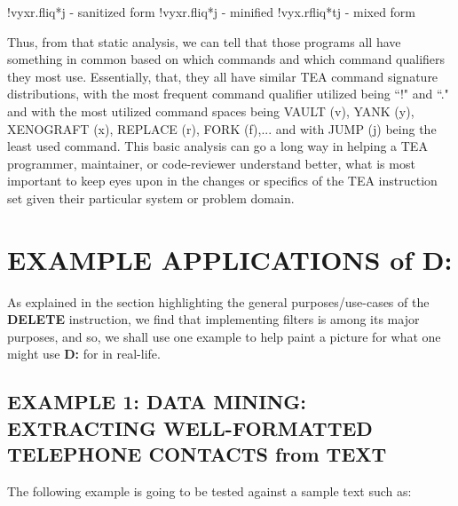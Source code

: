\documentclass[a4paper, 18pt]{book} %
\begin{document}
\vspace{2em}

   \begin{tcbverbatim}[title=Sample TEA Program Signature Outputs from Fibonacci Programs]
!vyxr.fliq*j - sanitized form
!vyxr.fliq*j - minified
!vyx.rfliq*tj - mixed form
  \end{tcbverbatim}

\vspace{2em}

Thus, from that static analysis, we can tell that those programs all have something in common based on which commands and which command qualifiers they most use. Essentially, that, they all have similar TEA command signature distributions, with the most frequent command qualifier utilized being ``!" and ``." and with the most utilized command spaces being VAULT (v), YANK (y), XENOGRAFT (x), REPLACE (r), FORK (f),... and with JUMP (j) being the least used command. This basic analysis can go a long way in helping a TEA programmer, maintainer, or code-reviewer understand better, what is most important to keep eyes upon in the changes or specifics of the TEA instruction set given their particular system or problem domain.
 


 
\section{EXAMPLE APPLICATIONS of D:}
\label{SECEXAMPD}

  
As explained in the section highlighting the general purposes/use-cases of the \textbf{DELETE} instruction, we find that implementing filters is among its major purposes, and so, we shall use one example to help paint a picture for what one might use \textbf{D:} for in real-life.


\subsection{EXAMPLE 1: \textbf{DATA MINING:} EXTRACTING WELL-FORMATTED TELEPHONE CONTACTS from TEXT}
\label{SECEXAMP1D}


The following example is going to be tested against a sample text such as:
\end{document}
